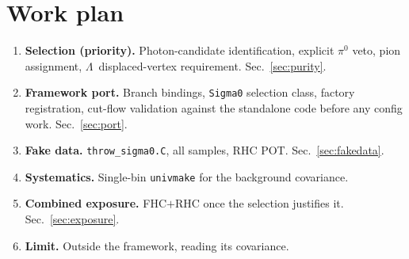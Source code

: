 \documentclass[11pt,a4paper]{article}
\newcommand{\Lam}{\ensuremath{\Lambda}}
\begin{document}
\section{Work plan}

\begin{enumerate}
  \item \textbf{Selection (priority).} Photon-candidate identification, explicit
        $\pi^0$ veto, pion assignment, \Lam\ displaced-vertex requirement.
        Sec.~\ref{sec:purity}.
  \item \textbf{Framework port.} Branch bindings, \texttt{Sigma0} selection class,
        factory registration, cut-flow validation against the standalone code
        before any config work. Sec.~\ref{sec:port}.
  \item \textbf{Fake data.} \texttt{throw\_sigma0.C}, all samples, RHC POT.
        Sec.~\ref{sec:fakedata}.
  \item \textbf{Systematics.} Single-bin \texttt{univmake} for the background
        covariance.
  \item \textbf{Combined exposure.} FHC$+$RHC once the selection justifies it.
        Sec.~\ref{sec:exposure}.
  \item \textbf{Limit.} Outside the framework, reading its covariance.
\end{enumerate}
\end{document}
